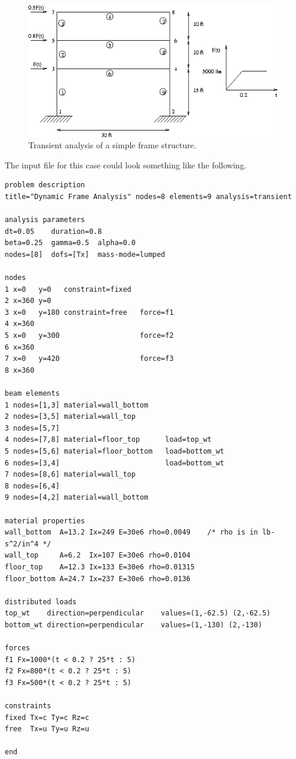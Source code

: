 \begin{figure}[htb]
 \begin{center}
  \includegraphics[width=6in]{figures/example2}
 \end{center}
 \caption{Transient analysis of a simple frame structure.}
 \label{problem.example2}
\end{figure}

The input file for this case could look something like the following.

\begin{screen}
 \begin{verbatim}
problem description
title="Dynamic Frame Analysis" nodes=8 elements=9 analysis=transient

analysis parameters
dt=0.05    duration=0.8
beta=0.25  gamma=0.5  alpha=0.0
nodes=[8]  dofs=[Tx]  mass-mode=lumped

nodes
1 x=0   y=0   constraint=fixed
2 x=360 y=0
3 x=0   y=180 constraint=free   force=f1
4 x=360     
5 x=0   y=300                   force=f2
6 x=360
7 x=0   y=420                   force=f3
8 x=360

beam elements
1 nodes=[1,3] material=wall_bottom
2 nodes=[3,5] material=wall_top
3 nodes=[5,7] 
4 nodes=[7,8] material=floor_top      load=top_wt    
5 nodes=[5,6] material=floor_bottom   load=bottom_wt
6 nodes=[3,4]                         load=bottom_wt
7 nodes=[8,6] material=wall_top	     
8 nodes=[6,4]
9 nodes=[4,2] material=wall_bottom

material properties
wall_bottom  A=13.2 Ix=249 E=30e6 rho=0.0049    /* rho is in lb-s^2/in^4 */
wall_top     A=6.2  Ix=107 E=30e6 rho=0.0104
floor_top    A=12.3 Ix=133 E=30e6 rho=0.01315
floor_bottom A=24.7 Ix=237 E=30e6 rho=0.0136

distributed loads
top_wt    direction=perpendicular    values=(1,-62.5) (2,-62.5)
bottom_wt direction=perpendicular    values=(1,-130) (2,-130)

forces
f1 Fx=1000*(t < 0.2 ? 25*t : 5)
f2 Fx=800*(t < 0.2 ? 25*t : 5)
f3 Fx=500*(t < 0.2 ? 25*t : 5)

constraints
fixed Tx=c Ty=c Rz=c
free  Tx=u Ty=u Rz=u

end
 \end{verbatim}
\end{screen}

